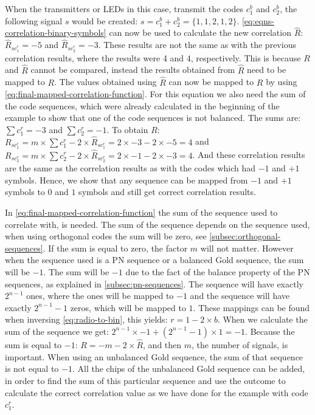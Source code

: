 When the transmitters or LEDs in this case, transmit the codes $c^b_1$ and $c^b_2$, the following signal $s$ would be created: $s = c^b_1 + c^b_2= \{ 1, 1, 2, 1, 2 \}$.
\autoref{eq:eqns-correlation-binary-symbols} can now be used to calculate the new correlation $\hat{R}$: $\hat{R}_{sc^r_{1}} = -5$ and $\hat{R}_{sc^r_{2}} = -3$.
These results are not the same as with the previous correlation results, where the results were 4 and 4, respectively.
This is because $R$ and $\hat{R}$ cannot be compared, instead the results obtained from $\hat{R}$ need to be mapped to $R$.
The values obtained using $\hat{R}$ can now be mapped to $R$ by using \autoref{eq:final-mapped-correlation-function}. %
For this equation we also need the sum of the code sequences, which were already calculated in the beginning of the example to show that one of the code sequences is not balanced.
The sums are: $\displaystyle\sum c^r_1 = -3$ and $\displaystyle\sum c^r_2 = -1$.
To obtain $R$: $R_{sc^r_{1}} = m \times \displaystyle\sum c^r_1 - 2 \times \hat{R}_{sc^r_1}  = 2 \times -3 - 2 \times -5 = 4$ and $R_{sc^r_{2}} = m \times \displaystyle\sum c^r_2 - 2 \times \hat{R}_{sc^r_2} = 2 \times -1 -2 \times -3 = 4$.
And these correlation results are the same as the correlation results as with the codes which had $-1$ and $+1$ symbols.
Hence, we show that any sequence can be mapped from $-1$ and $+1$ symbols to $0$ and $1$ symbols and still get correct correlation results.




In \autoref{eq:final-mapped-correlation-function} the sum of the sequence used to correlate with, is needed. 
The sum of the sequence depends on the sequence used, when using orthogonal codes the sum will be zero, see \autoref{subsec:orthogonal-sequences}.
If the sum is equal to zero, the factor $m$ will not matter.
However when the sequence used is a PN sequence or a balanced Gold sequence, the sum will be $-1$.
The sum will be $-1$ due to the fact of the balance property of the PN sequences, as explained in \autoref{subsec:pn-sequences}.
The sequence will have exactly $2^{n-1}$ ones, where the ones will be mapped to $-1$ and the sequence will have exactly $2^{n-1} -1$ zeros, which will be mapped to $1$.
These mappings can be found when inversing \autoref{eq:radio-to-bin}, this yields: $r = 1 - 2 \times b$.
When we calculate the sum of the sequence we get: $2^{n-1} \times -1 + (2^{n-1} - 1) \times 1 = -1$.
Because the sum is equal to $-1$: $R = -m - 2 \times \hat{R}$, and then $m$, the number of signals, is important.
When using an unbalanced Gold sequence, the sum of that sequence is not equal to $-1$.
All the chips of the unbalanced Gold sequence can be added, in order to find the sum of this particular sequence and use the outcome to calculate the correct correlation value as we have done for the example with code $c^r_1$.










